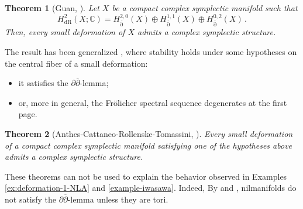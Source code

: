 \documentclass[a4paper]{amsart}
\newtheorem{theorem}{Theorem}[section]
\theoremstyle{definition}
\theoremstyle{remark}
\newcommand{\db}{\operatorname{\overline{\partial}}}
\numberwithin{equation}{section}
\begin{document}
\begin{theorem}[Guan, \cite{guan}]\label{thm-Guan}
Let $X$ be a compact complex symplectic manifold such that
\[
H_{\mathrm{dR}}^2(X;\mathbb C)=H_{\db}^{2,0}(X)\oplus H_{\db}^{1,1}(X)\oplus H_{\db}^{0,2}(X)\,.
\]
Then, every small deformation of $X$ admits a complex symplectic structure.
\end{theorem}

The result has been generalized \cite{anthes-cattaneo-rollenske-tomassini}, where stability holds under some hypotheses on the central fiber of a small deformation:
\begin{itemize}
    \item it satisfies the $\partial\overline\partial$-lemma;
    \item or, more in general, the Frölicher spectral sequence degenerates at the first page.
\end{itemize}
\begin{theorem}[Anthes-Cattaneo-Rollenske-Tomassini, \cite{anthes-cattaneo-rollenske-tomassini}]\label{thm-ACRT}
Every small deformation of a compact complex symplectic manifold satisfying one of the hypotheses above admits a complex symplectic structure.
\end{theorem}

These theorems can not be used to explain the behavior observed in Examples \ref{ex:deformation-1-NLA} and \ref{example-iwasawa}. Indeed, By \cite{DGMS} and \cite{hasegawa2}, nilmanifolds do not satisfy the $\partial\overline\partial$-lemma unless they are tori.\\



\end{document}
